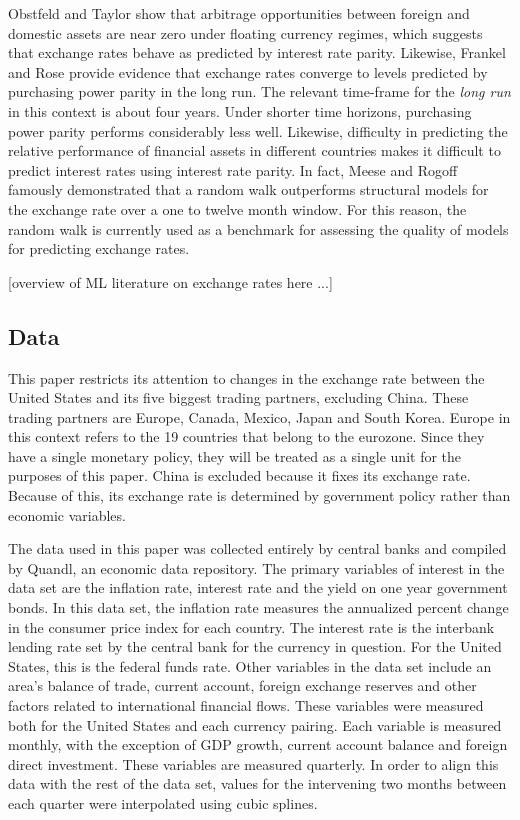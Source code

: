 \documentclass{sig-alternate-05-2015}
\begin{document}
\par{} Obstfeld and Taylor show that arbitrage opportunities between foreign and domestic assets are near zero under floating currency regimes, which suggests that exchange rates behave as predicted by interest rate parity. Likewise, Frankel and Rose provide evidence that exchange rates converge to levels predicted by purchasing power parity in the long run. The relevant time-frame for the \emph{long run} in this context is about four years. Under shorter time horizons, purchasing power parity performs considerably less well. Likewise, difficulty in predicting the relative performance of financial assets in different countries makes it difficult to predict interest rates using interest rate parity. In fact, Meese and Rogoff famously demonstrated that a random walk outperforms structural models for the exchange rate over a one to twelve month window. For this reason, the random walk is currently used as a benchmark for assessing the quality of models for predicting exchange rates.
\par{} [overview of ML literature on exchange rates here ...]

\subsection{Data}
This paper restricts its attention to changes in the exchange rate between the United States and its five biggest trading partners, excluding China. These trading partners are Europe, Canada, Mexico, Japan and South Korea. Europe in this context refers to the 19 countries that belong to the eurozone. Since they have a single monetary policy, they will be treated as a single unit for the purposes of this paper. China is excluded because it fixes its exchange rate. Because of this, its exchange rate is determined by government policy rather than economic variables.
\par{} The data used in this paper was collected entirely by central banks and compiled by Quandl, an economic data repository. The primary variables of interest in the data set are the inflation rate, interest rate and the yield on one year government bonds. In this data set, the inflation rate measures the annualized percent change in the consumer price index for each country. The interest rate is the interbank lending rate set by the central bank for the currency in question. For the United States, this is the federal funds rate.  Other variables in the data set include an area's balance of trade, current account, foreign exchange reserves and other factors related to international financial flows. These variables were measured both for the United States and each currency pairing. Each variable is measured monthly, with the exception of GDP growth, current account balance and foreign direct investment. These variables are measured quarterly. In order to align this data with the rest of the data set, values for the intervening two months between each quarter were interpolated using cubic splines.
\end{document}
